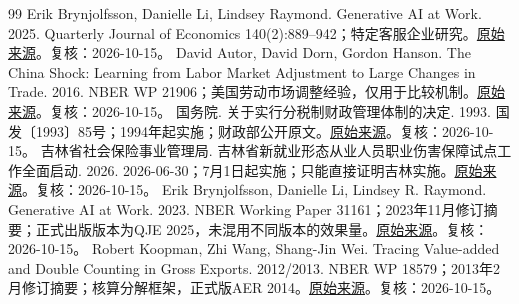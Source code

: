 \documentclass[UTF8,fontset=fandol,zihao=-4,oneside,openany]{ctexbook}
\begin{document}
\begin{thebibliography}{99}
 Erik Brynjolfsson, Danielle Li, Lindsey Raymond. Generative AI at Work. 2025. Quarterly Journal of Economics 140(2):889–942；特定客服企业研究。\href{\detokenize{https://academic.oup.com/qje/article/140/2/889/7990658}}{原始来源}。复核：2026-10-15。
 David Autor, David Dorn, Gordon Hanson. The China Shock: Learning from Labor Market Adjustment to Large Changes in Trade. 2016. NBER WP 21906；美国劳动市场调整经验，仅用于比较机制。\href{\detokenize{https://www.nber.org/papers/w21906}}{原始来源}。复核：2026-10-15。
 国务院. 关于实行分税制财政管理体制的决定. 1993. 国发〔1993〕85号；1994年起实施；财政部公开原文。\href{\detokenize{https://yss.mof.gov.cn/zhuantilanmu/cztzgg/zcgz/200806/t20080627_54328.htm}}{原始来源}。复核：2026-10-15。
 吉林省社会保险事业管理局. 吉林省新就业形态从业人员职业伤害保障试点工作全面启动. 2026. 2026-06-30；7月1日起实施；只能直接证明吉林实施。\href{\detokenize{https://jlsi.jl.gov.cn/sbdt/202606/t20260630_9656905.html}}{原始来源}。复核：2026-10-15。
 Erik Brynjolfsson, Danielle Li, Lindsey R. Raymond. Generative AI at Work. 2023. NBER Working Paper 31161；2023年11月修订摘要；正式出版版本为QJE 2025，未混用不同版本的效果量。\href{\detokenize{https://www.nber.org/papers/w31161}}{原始来源}。复核：2026-10-15。
 Robert Koopman, Zhi Wang, Shang-Jin Wei. Tracing Value-added and Double Counting in Gross Exports. 2012/2013. NBER WP 18579；2013年2月修订摘要；核算分解框架，正式版AER 2014。\href{\detokenize{https://www.nber.org/papers/w18579}}{原始来源}。复核：2026-10-15。
\end{thebibliography}

\end{document}
